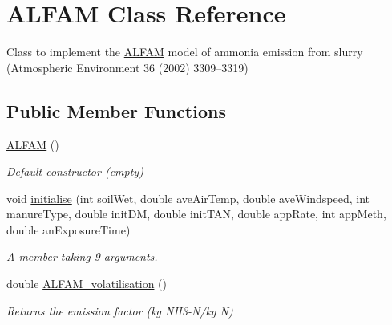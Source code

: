 \hypertarget{class_a_l_f_a_m}{}\section{A\+L\+F\+AM Class Reference}
\label{class_a_l_f_a_m}


Class to implement the \mbox{\hyperlink{class_a_l_f_a_m}{A\+L\+F\+AM}} model of ammonia emission from slurry (Atmospheric Environment 36 (2002) 3309–3319)  


\subsection*{Public Member Functions}
\begin{DoxyCompactItemize}
\item 
\mbox{\label{class_a_l_f_a_m_a906de2a7e6a63d037313aecb092e08fa}} 
\mbox{\hyperlink{class_a_l_f_a_m_a906de2a7e6a63d037313aecb092e08fa}{A\+L\+F\+AM}} ()
\begin{DoxyCompactList}\small\item\em Default constructor (empty) \end{DoxyCompactList}\item 
void \mbox{\hyperlink{class_a_l_f_a_m_a99b2b359704634465506484436dbd8f2}{initialise}} (int soil\+Wet, double ave\+Air\+Temp, double ave\+Windspeed, int manure\+Type, double init\+DM, double init\+T\+AN, double app\+Rate, int app\+Meth, double an\+Exposure\+Time)
\begin{DoxyCompactList}\small\item\em A member taking 9 arguments. \end{DoxyCompactList}\item 
\mbox{\label{class_a_l_f_a_m_a74f67c0b90bec2b1423add60999fb332}} 
double \mbox{\hyperlink{class_a_l_f_a_m_a74f67c0b90bec2b1423add60999fb332}{A\+L\+F\+A\+M\+\_\+volatilisation}} ()
\begin{DoxyCompactList}\small\item\em Returns the emission factor (kg N\+H3-\/\+N/kg N) \end{DoxyCompactList}\end{DoxyCompactItemize}
